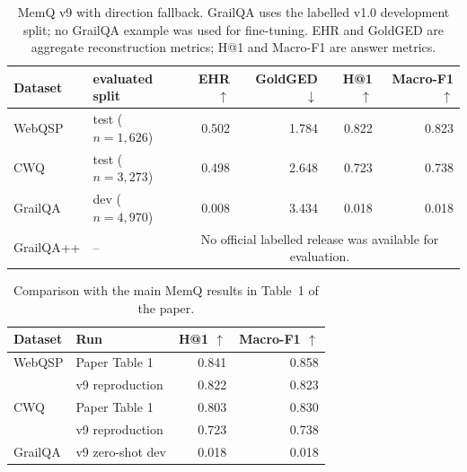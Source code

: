 \begin{table}[t]
  \centering
  \caption{MemQ v9 with direction fallback. GrailQA uses the labelled v1.0
  development split; no GrailQA example was used for fine-tuning. EHR and
  GoldGED are aggregate reconstruction metrics; H@1 and Macro-F1 are answer
  metrics.}
  \label{tab:memq-v9-all-datasets}
  \begin{tabular}{llrrrr}
    \toprule
    Dataset & evaluated split & EHR $\uparrow$ & GoldGED $\downarrow$ & H@1 $\uparrow$ & Macro-F1 $\uparrow$ \\
    \midrule
    WebQSP & test ($n=1{,}626$) & 0.502 & 1.784 & 0.822 & 0.823 \\
    CWQ & test ($n=3{,}273$) & 0.498 & 2.648 & 0.723 & 0.738 \\
    GrailQA & dev ($n=4{,}970$) & 0.008 & 3.434 & 0.018 & 0.018 \\
    GrailQA++ & -- & \multicolumn{4}{c}{No official labelled release was available for evaluation.} \\
    \bottomrule
  \end{tabular}
\end{table}

\begin{table}[t]
  \centering
  \caption{Comparison with the main MemQ results in Table~1 of the paper.}
  \label{tab:memq-v9-paper-main-comparison}
  \begin{tabular}{llrr}
    \toprule
    Dataset & Run & H@1 $\uparrow$ & Macro-F1 $\uparrow$ \\
    \midrule
    WebQSP & Paper Table 1 & 0.841 & 0.858 \\
           & v9 reproduction & 0.822 & 0.823 \\
    CWQ    & Paper Table 1 & 0.803 & 0.830 \\
           & v9 reproduction & 0.723 & 0.738 \\
    GrailQA & v9 zero-shot dev & 0.018 & 0.018 \\
    \bottomrule
  \end{tabular}
\end{table}

